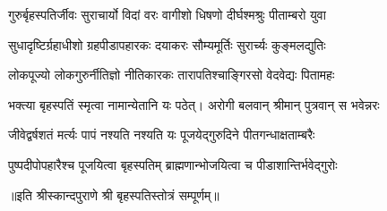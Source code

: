 

\twolineshloka
{गुरुर्बृहस्पतिर्जीवः सुराचार्यो विदां वरः}
{वागीशो धिषणो दीर्घश्मश्रुः पीताम्बरो युवा}

\twolineshloka
{सुधादृष्टिर्ग्रहाधीशो ग्रहपीडापहारकः}
{दयाकरः सौम्यमूर्तिः सुरार्च्यः कुङ्मलद्युतिः}

\twolineshloka
{लोकपूज्यो लोकगुरुर्नीतिज्ञो नीतिकारकः}
{तारापतिश्चाङ्गिरसो वेदवेद्यः पितामहः}

\twolineshloka
{भक्त्या बृहस्पतिं स्मृत्वा नामान्येतानि यः पठेत्।}
{अरोगी बलवान् श्रीमान् पुत्रवान् स भवेन्नरः}

\twolineshloka
{जीवेद्वर्षशतं मर्त्यः पापं नश्यति नश्यति}
{यः पूजयेद्गुरुदिने पीतगन्धाक्षताम्बरैः}

\twolineshloka
{पुष्पदीपोपहारैश्च पूजयित्वा बृहस्पतिम्}
{ब्राह्मणान्भोजयित्वा च पीडाशान्तिर्भवेद्गुरोः}

॥इति श्रीस्कान्दपुराणे श्री बृहस्पतिस्तोत्रं सम्पूर्णम्॥
